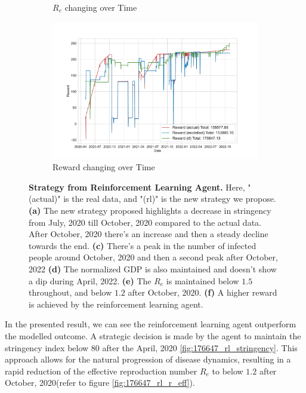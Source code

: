 \documentclass[tikz,fleqn,12pt]{wlscirep}
\begin{document}
\begin{figure}[htbp!]
\begin{subfigure}[t]{0.48\textwidth}
    \caption{$R_e$ changing over Time}
  \end{subfigure}
  \label{fig:176647_rl_r_eff}
  \hfill
  \begin{subfigure}[t]{0.48\textwidth}
    \centering
    \includegraphics[width=\linewidth]{images/176647/rl_reward.pdf}
    \caption{Reward changing over Time}
  \end{subfigure}
  \label{fig:176647_rl_reward}
  \caption{\textbf{Strategy from Reinforcement Learning Agent.} Here, "(actual)" is the real data, and "(rl)" is the new strategy we propose. \textbf{(a)} The new strategy proposed highlights a decrease in stringency from July, 2020 till October, 2020 compared to the actual data. After October, 2020 there's an increase and then a steady decline towards the end. \textbf{(c)} There's a peak in the number of infected people around October, 2020 and then a second peak after October, 2022 \textbf{(d)} The normalized GDP is also maintained and doesn't show a dip during April, 2022. \textbf{(e)} The $R_e$ is maintained below $1.5$ throughout, and below $1.2$ after October, 2020. \textbf{(f)} A higher reward is achieved by the reinforcement learning agent.}
\end{figure}
In the presented result, we can see the reinforcement learning agent outperform the modelled outcome. A strategic decision is made by the agent to maintain the stringency index below 80 after the April, 2020 \cref{fig:176647_rl_stringency}. This approach allows for the natural progression of disease dynamics, resulting in a rapid reduction of the effective reproduction number $R_e$ to below $1.2$ after October, 2020(refer to figure \cref{fig:176647_rl_r_eff}).
\end{document}
